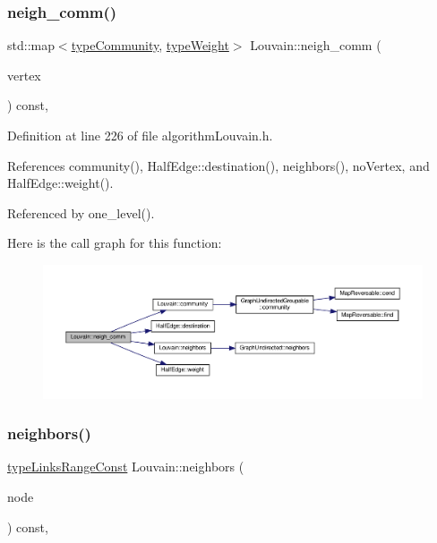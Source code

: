 \subsubsection{\texorpdfstring{neigh\+\_\+comm()}{neigh\_comm()}}
{\footnotesize\ttfamily std\+::map$<$\hyperlink{graphUndirectedGroupable_8h_a914da95c9ea7f14f4b7f875c36818556}{type\+Community}, \hyperlink{edge_8h_a2e7ea3be891ac8b52f749ec73fee6dd2}{type\+Weight}$>$ Louvain\+::neigh\+\_\+comm (\begin{DoxyParamCaption}\item[{const \hyperlink{edge_8h_a5fbd20c46956d479cb10afc9855223f6}{type\+Vertex} \&}]{vertex }\end{DoxyParamCaption}) const\hspace{0.3cm}{\ttfamily [inline]}, {\ttfamily [private]}}



Definition at line 226 of file algorithm\+Louvain.\+h.



References community(), Half\+Edge\+::destination(), neighbors(), no\+Vertex, and Half\+Edge\+::weight().



Referenced by one\+\_\+level().

Here is the call graph for this function\+:
\nopagebreak
\begin{figure}[H]
\begin{center}
\leavevmode
\includegraphics[width=350pt]{classLouvain_a22ad57b173ccd1b628d96391811a4265_cgraph}
\end{center}
\end{figure}
\mbox{\label{classLouvain_a68749bff6ff4894606b660cc827f9d79}} 
\subsubsection{\texorpdfstring{neighbors()}{neighbors()}}
{\footnotesize\ttfamily \hyperlink{graphInterface_8h_ae8d27008f15586bbf419af7ad2e0a48a}{type\+Links\+Range\+Const} Louvain\+::neighbors (\begin{DoxyParamCaption}\item[{const \hyperlink{edge_8h_a5fbd20c46956d479cb10afc9855223f6}{type\+Vertex} \&}]{node }\end{DoxyParamCaption}) const\hspace{0.3cm}{\ttfamily [inline]}, {\ttfamily [private]}}



